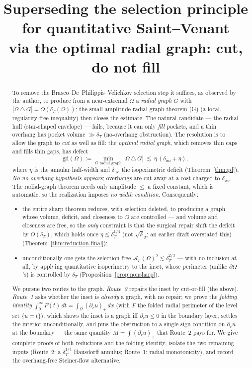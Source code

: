 \documentclass[11pt]{article}
\title{Superseding the selection principle for quantitative
Saint--Venant\\
\large via the optimal radial graph: cut, do not fill}
\author{}
\date{}
\theoremstyle{definition}
\newcommand{\Om}{\Omega}
\newcommand{\dT}{\delta_T}
\newcommand{\diso}{\delta_{\mathrm{iso}}}
\newcommand{\AF}{\mathcal A_F}
\newcommand{\gd}{\mathrm{gd}}
\newcommand{\abs}[1]{\left|#1\right|}
\begin{document}
\maketitle

\begin{abstract}
To remove the Brasco--De~Philippis--Velichkov selection step it suffices,
as observed by the author, to produce from a near-extremal $\Om$ a
\emph{radial graph} $G$ with $\abs{\Om\,\triangle\,G}=O(\dT(\Om))$; the
small-amplitude radial-graph theorem (G) (a local, regularity-free
inequality) then closes the estimate. The natural candidate --- the radial
hull (star-shaped envelope) --- fails, because it can only \emph{fill}
pockets, and a thin overhang has pocket volume $\gg\dT$
(no-overhang obstruction). The resolution is to allow the graph to
\emph{cut} as well as fill: the \emph{optimal radial graph}, which removes
thin caps and fills thin gaps, has defect
\[
   \gd(\Om):=\min_{G\text{ radial graph}}\abs{\Om\,\triangle\,G}
   \ \lesssim\ \eta\,(\diso+\eta),
\]
where $\eta$ is the annular half-width and $\diso$ the isoperimetric
deficit (Theorem~\ref{thm:gd}). \emph{No no-overhang hypothesis appears};
overhangs are cut away at a cost charged to $\diso$. The radial-graph
theorem needs only amplitude $\le$ a fixed constant, which is automatic; so
the realization imposes \emph{no width condition}. Consequently:
\begin{itemize}[leftmargin=1.6em]
\item the entire sharp theorem reduces, with selection deleted, to
producing a graph whose volume, deficit, and closeness to $\Om$ are
controlled --- and volume and closeness are free, so the \emph{only}
constraint is that the surgical repair shift the deficit by $O(\dT)$, which
holds once $\eta\lesssim\dT^{1/4}$ \textup{(}not $\sqrt\dT$; an earlier
draft overstated this\textup{)} (Theorem~\ref{thm:reduction-final});
\item unconditionally one gets the selection-free
$\AF(\Om)^2\lesssim\dT^{2/3}$ --- with no inclusion at all, by applying
quantitative isoperimetry to the inset, whose perimeter (unlike
$\partial\Om$'s) is controlled by $\dT$ (Proposition~\ref{prop:nonsharp}).
\end{itemize}
We pursue two routes to the graph. \emph{Route~2} repairs the inset by
cut-or-fill (the above). \emph{Route~1} asks whether the inset is
\emph{already} a graph, with no repair; we prove the \emph{folding
identity} $\int_0^\infty F(t)\,dt=\int_\Om(\partial_r u)_+\,dx$ (with $F$
the folded radial perimeter of the level set $\{u=t\}$), which shows the
inset is a graph iff $\partial_r u\le0$ in the boundary layer, settles the
interior unconditionally, and pins the obstruction to a single sign
condition on $\partial_r u$ at the boundary --- the same quantity
$M=\int(\partial_r u)_+$ that Route~2 pays for. We give complete proofs of
both reductions and the folding identity, isolate the two remaining inputs
(Route~2: a $\dT^{1/4}$ Hausdorff annulus; Route~1: radial monotonicity),
and record the overhang-free Steiner-flow alternative.
\end{abstract}
\end{document}
